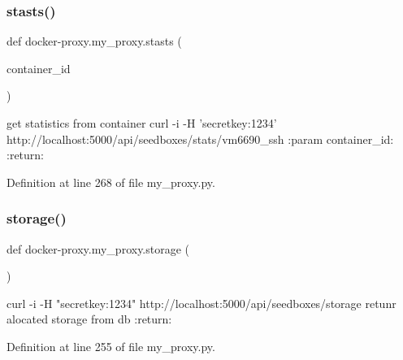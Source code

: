 \hypertarget{namespacedocker-proxy_1_1my__proxy_ae108a533f8a3353f199f69883994c3cf}{}\label{namespacedocker-proxy_1_1my__proxy_ae108a533f8a3353f199f69883994c3cf} 
\subsubsection{\texorpdfstring{stasts()}{stasts()}}
{\footnotesize\ttfamily def docker-\/proxy.\+my\+\_\+proxy.\+stasts (\begin{DoxyParamCaption}\item[{}]{container\+\_\+id }\end{DoxyParamCaption})}

\begin{DoxyVerb}get statistics from container
curl -i -H 'secretkey:1234'  http://localhost:5000/api/seedboxes/stats/vm6690_ssh
:param container_id:
:return:
\end{DoxyVerb}
 

Definition at line 268 of file my\+\_\+proxy.\+py.

\hypertarget{namespacedocker-proxy_1_1my__proxy_a2d2a47f5b69859690e7d948cbe5898a4}{}\label{namespacedocker-proxy_1_1my__proxy_a2d2a47f5b69859690e7d948cbe5898a4} 
\subsubsection{\texorpdfstring{storage()}{storage()}}
{\footnotesize\ttfamily def docker-\/proxy.\+my\+\_\+proxy.\+storage (\begin{DoxyParamCaption}{ }\end{DoxyParamCaption})}

\begin{DoxyVerb}curl -i -H "secretkey:1234" http://localhost:5000/api/seedboxes/storage
retunr alocated storage from db
:return:
\end{DoxyVerb}
 

Definition at line 255 of file my\+\_\+proxy.\+py.

\hypertarget{namespacedocker-proxy_1_1my__proxy_a5c4e8ad5904fc41dc6e53312834445ae}{}\label{namespacedocker-proxy_1_1my__proxy_a5c4e8ad5904fc41dc6e53312834445ae} 
